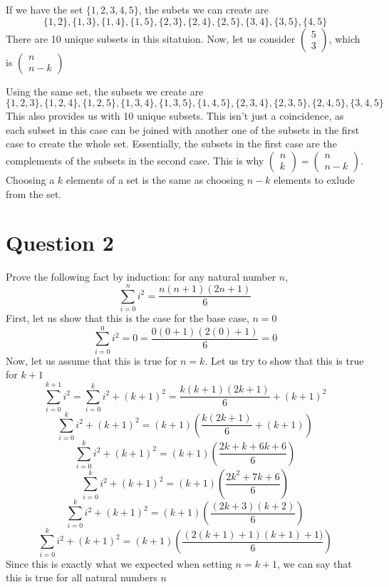 \documentclass[hidelinks]{article}
\begin{document}
If we have the set $\{1, 2, 3, 4, 5\}$, the subets we can create are 
\[
    \{1, 2\}, \{1, 3\}, \{1, 4\}, \{1, 5\}, \{2, 3\}, \{2, 4\}, \{2, 5\}, \{3, 4\}, \{3, 5\}, \{4, 5\}
\]
There are 10 unique subsets in this sitatuion. Now, let us consider $\begin{pmatrix} 5\\ 3 \end{pmatrix}$, which is $\begin{pmatrix} n \\ n-k \end{pmatrix}$

Using the same set, the subsets we create are 
\[
    \{1, 2, 3\}, \{1, 2, 4\}, \{1, 2, 5\}, \{1, 3, 4\}, \{1, 3, 5\}, \{1, 4, 5\}, \{2, 3, 4\}, \{2, 3, 5\}, \{2, 4, 5\}, \{3, 4, 5\}
\]
This also provides us with 10 unique subsets. This isn't just a coincidence, as each subset in this case can be joined with another one of the subsets in the first case to create the whole set. Essentially, the subsets in the first case are the complements of the subsets in the second case. This is why $\begin{pmatrix}n \\ k \end{pmatrix} = \begin{pmatrix}n \\ n-k \end{pmatrix}$. Choosing a $k$ elements of a set is the same as choosing $n - k$ elements to exlude from the set.
\newpage
\section*{Question 2}
Prove the following fact by induction: for any natural number $n$, 
\[
    \sum_{i=0}^{n} i^2 = \frac{n(n+1)(2n+1)}{6}
\]
First, let us show that this is the case for the base case, $n = 0$
\[
    \sum_{i=0}^{0} i^2 = 0 = \frac{0(0+1)(2(0)+1)}{6} = 0
\]
Now, let us assume that this is true for $n = k$. Let us try to show that this is true for $k+1$ 
\[ 
    \sum_{i=0}^{k+1} i^2  = \sum_{i=0}^{k} i^2 + (k+1)^2 = \frac{k(k+1)(2k+1)}{6} + (k+1)^2
\]
\[
    \sum_{i=0}^{k} i^2 + (k+1)^2  = (k+1)\left (\frac{k(2k+1)}{6} + (k+1)\right)
\]
\[
    \sum_{i=0}^{k} i^2 + (k+1)^2  = (k+1)\left (\frac{2k+k+6k+6}{6} \right)
\]
\[
    \sum_{i=0}^{k} i^2 + (k+1)^2  = (k+1)\left (\frac{2k^2+7k+6}{6} \right)
\]
\[
    \sum_{i=0}^{k} i^2 + (k+1)^2  = (k+1)\left (\frac{(2k+3)(k+2)}{6} \right)
\]
\[
    \sum_{i=0}^{k} i^2 + (k+1)^2  = (k+1)\left (\frac{(2(k+1) + 1)(k+1) + 1)}{6} \right)
\]
Since this is exactly what we expected when setting $n=k+1$, we can say that this is true for all natural numbers $n$
\newpage
\end{document}
